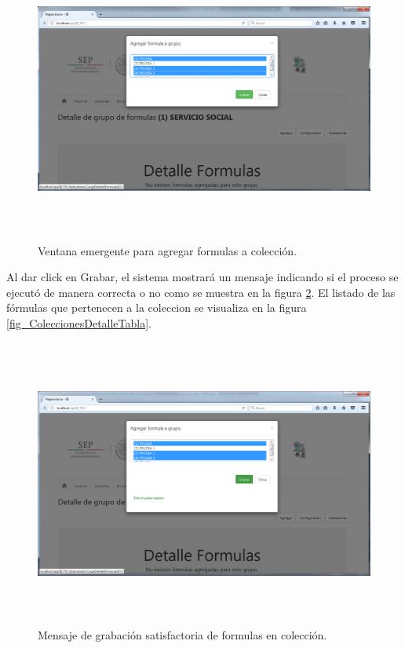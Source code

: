 		    	\begin{figure}[]
			        \centering
			        \includegraphics[width=16cm, height=9.5cm]{figuras/ColeccionesDetalleAgregar}
			        \caption{Ventana emergente para agregar formulas a colecci\'on.}
			        \label{fig_ColeccionesDetalleAgregar}
			    \end{figure}

			    Al dar click en Grabar, el sistema mostrar\'a un mensaje indicando si el proceso se ejecut\'o de manera correcta o no como se muestra en la figura \ref{fig_ColeccionesDetalleGrabar}. El listado de las f\'ormulas que pertenecen a la coleccion se visualiza en la figura \ref{fig_ColeccionesDetalleTabla}.

			    \begin{figure}[]
			        \centering
			        \includegraphics[width=16cm, height=9.5cm]{figuras/ColeccionesDetalleGrabar}
			        \caption{Mensaje de grabaci\'on satisfactoria de formulas en colecci\'on.}
			        \label{fig_ColeccionesDetalleGrabar}
			    \end{figure}

